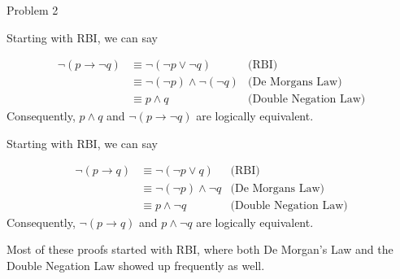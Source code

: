 \begin{problem}{Problem 2}
    \begin{Highlight}
        Starting with RBI, we can say

        \begin{align*}
            \neg(p \rightarrow \neg q) & \equiv \neg(\neg p \vee \neg q) & \text{(RBI)} \\
            & \equiv \neg(\neg p) \wedge \neg(\neg q) & \text{(De Morgans Law)} \\
            & \equiv p \wedge q & \text{(Double Negation Law)}
        \end{align*}
        Consequently, $p \wedge q$ and $\neg(p \rightarrow \neg q)$ are logically equivalent.
    \end{Highlight}

    \begin{Highlight}
        Starting with RBI, we can say

        \begin{align*}
            \neg(p \rightarrow q) & \equiv \neg (\neg p \vee q) & \text{(RBI)} \\
            & \equiv \neg(\neg p) \wedge \neg q & \text{(De Morgans Law)} \\
            & \equiv p \wedge \neg q & \text{(Double Negation Law)}
        \end{align*}
        Consequently, $\neg(p \rightarrow q)$ and $p \wedge \neg q$ are logically equivalent.
    \end{Highlight}

    \begin{Highlight}[Insights]
        Most of these proofs started with RBI, where both De Morgan's Law and the Double Negation Law showed up frequently as well.
    \end{Highlight}
\end{problem}

